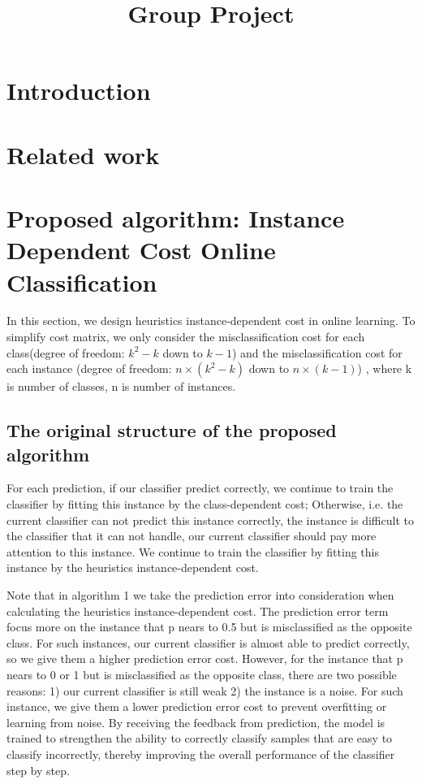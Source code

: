 \documentclass{article}
\title{Group Project}
\author{}
\begin{document}
\maketitle

\begin{abstract}

\end{abstract}

\section{Introduction}

\section{Related work}



\section{Proposed algorithm: Instance Dependent Cost Online Classification}

In this section, we design heuristics instance-dependent cost in online learning. To simplify cost matrix, we only consider the misclassification cost for each class(degree of freedom: $k^2-k$ down to $k-1$) and the misclassification cost for each instance (degree of freedom: $n\times(k^2-k)$ down to $n\times(k-1)$) , where k is number of classes, n is number of instances. 

\subsection{The original structure of the proposed algorithm}

For each prediction, if our classifier predict correctly, we continue to train the classifier by fitting this instance by the class-dependent cost; Otherwise, i.e. the current classifier can not predict this instance correctly, the instance is difficult to the classifier that it can not handle, our current classifier should pay more attention to this instance. We continue to train the classifier by fitting this instance by the heuristics instance-dependent cost.

Note that in algorithm 1 we take the prediction error into consideration when calculating the heuristics instance-dependent cost. The prediction error term focus more on the instance that p nears to 0.5 but is misclassified as the opposite class. For such instances, our current classifier is almost able to predict correctly, so we give them a higher prediction error cost. However, for the instance that p nears to 0 or 1 but is misclassified as the opposite class, there are two possible reasons: 1) our current classifier is still weak 2) the instance is a noise. For such instance, we give them a lower prediction error cost to prevent overfitting or learning from noise. By receiving the feedback from prediction, the model is trained to strengthen the ability to correctly classify samples that are easy to classify incorrectly, thereby improving the overall performance of the classifier step by step.
\end{document}

